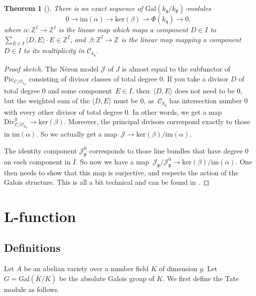 \documentclass[12pt]{article}
\newtheorem{theorem}{Theorem}[section]
\theoremstyle{definition}
\numberwithin{equation}{subsection}
\newcommand{\Z}{\ensuremath{\mathbb{Z}}}
\begin{document}
\begin{theorem}[\textrm{\cite[Thm.~1.1]{BoschLiu}}]
There is an exact sequence of $\mathrm{Gal}(k_\mathfrak{q}/k_\mathfrak{p})$-modules
$$0 \to \mathrm{im}(\alpha) \to \mathrm{ker}(\beta) \to \Phi(k_\mathfrak{q}) \to 0,$$
where $\alpha \colon \Z^I \to \Z^I$ is the linear map which maps a component $D \in I$ to $\sum_{E \in I} \langle D, E \rangle \cdot E \in \Z^I$, and~$\beta \colon \Z^I \to \Z$ is the linear map mapping a component $D \in I$ to its multiplicity in $\mathcal{C}_{k_\mathfrak{q}}$.
\end{theorem}

\begin{proof}[Proof sketch]
The N\'eron model $\mathcal{J}$ of $J$ is almost equal to the subfunctor of $\mathrm{Pic}_{\mathcal{C}/\mathcal{O}_{k_\mathfrak{q}}}$ consisting of divisor classes of total degree 0.
If you take a divisor $D$ of total degree 0 and some component~$E \in I$, then~$\langle D, E\rangle$ does not need to be 0, but the weighted sum of the $\langle D,E \rangle$ must be 0, as~$\mathcal{C}_{k_\mathfrak{q}}$ has intersection number 0 with every other divisor of total degree 0.
In other words, we get a map~$\mathrm{Div}^{0}_{\mathcal{C}/\mathcal{O}_{k_\mathfrak{q}}} \to \mathrm{ker}(\beta)$.
Moreover, the principal divisors correspond exactly to those in $\mathrm{im}(\alpha)$.
So we actually get a map~$\mathcal{J} \to \mathrm{ker}(\beta) / \mathrm{im}(\alpha)$.

The identity component $\mathcal{J}_\mathfrak{p}^0$ corresponds to those line bundles that have degree 0 on each component in $I$.
So now we have a map~$\mathcal{J}_\mathfrak{p}/\mathcal{J}_\mathfrak{p}^0 \to \mathrm{ker}(\beta) / \mathrm{im}(\alpha)$.
One then needs to show that this map is surjective, and respects the action of the Galois structure.
This is all a bit technical and can be found in \cite{BoschLiu, BLR}.
\end{proof}

\section{L-function}

\subsection{Definitions}

Let $A$ be an abelian variety over a number field $K$ of dimension $g$.
Let $G = \mathrm{Gal}(\overline{K}/K)$ be the absolute Galois group of $K$.
We first define the Tate module as follows.
\end{document}
